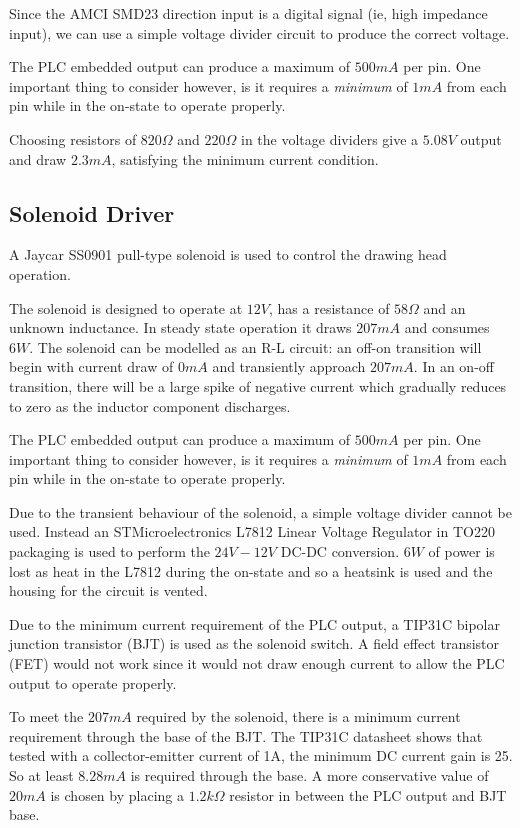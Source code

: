 		Since the AMCI SMD23 direction input is a digital signal (ie, high impedance input), we can use a simple voltage divider circuit to produce the correct voltage. 
		
		The PLC embedded output can produce a maximum of $500mA$ per pin. One important thing to consider however, is it requires a \emph{minimum} of $1mA$ from each pin while in the on-state to operate properly. 
		
		Choosing resistors of $820\Omega$ and $220\Omega$ in the voltage dividers give a $5.08V$ output and draw $2.3mA$, satisfying the minimum current condition. 
	\subsection{Solenoid Driver}
		A Jaycar SS0901 pull-type solenoid is used to control the drawing head operation.
		
		The solenoid is designed to operate at $12V$, has a resistance of $58\Omega$ and an unknown inductance. In steady state operation it draws $207mA$ and consumes $6W$. The solenoid can be modelled as an R-L circuit: an off-on transition will begin with current draw of $0mA$ and transiently approach $207mA$. In an on-off transition, there will be a large spike of negative current which gradually reduces to zero as the inductor component discharges.
		
		The PLC embedded output can produce a maximum of $500mA$ per pin. One important thing to consider however, is it requires a \emph{minimum} of $1mA$ from each pin while in the on-state to operate properly. 
		
		Due to the transient behaviour of the solenoid, a simple voltage divider cannot be used. Instead an STMicroelectronics L7812 Linear Voltage Regulator in TO220 packaging is used to perform the $24V-12V$ DC-DC conversion. $6W$ of power is lost as heat in the L7812 during the on-state and so a heatsink is used and the housing for the circuit is vented.
		
		Due to the minimum current requirement of the PLC output, a TIP31C bipolar junction transistor (BJT) is used as the solenoid switch. A field effect transistor (FET) would not work since it would not draw enough current to allow the PLC output to operate properly.
		
		To meet the $207mA$ required by the solenoid, there is a minimum current requirement through the base of the BJT. The TIP31C datasheet shows that tested with a collector-emitter current of 1A, the minimum DC current gain is 25. So at least $8.28mA$ is required through the base. A more conservative value of $20mA$ is chosen by placing a $1.2k\Omega$ resistor in between the PLC output and BJT base.
		
